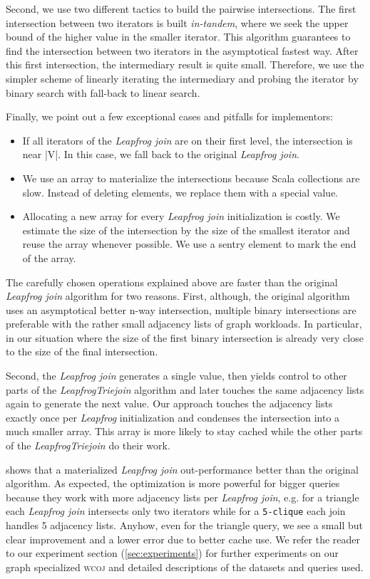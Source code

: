 Second, we use two different tactics to build the pairwise intersections.
The first intersection between two iterators is built \textit{in-tandem},  where we seek
the upper bound of the higher value in the smaller iterator.
This algorithm guarantees to find the intersection between two iterators in the asymptotical fastest
way.
After this first intersection, the intermediary result is quite small.
Therefore, we use the simpler scheme of linearly iterating the intermediary and probing
the iterator by binary search with fall-back to linear search.

Finally, we point out a few exceptional cases and pitfalls for implementors:
\begin{itemize}
\item If all iterators of the \textit{Leapfrog join} are on their first level, the intersection is near |V|. In this case, we fall back
to the original
\textit{Leapfrog join}.
\item We use an array to materialize the intersections because Scala collections are slow.
Instead of deleting elements, we replace them with a special value.
\item Allocating a new array for every \textit{Leapfrog join} initialization is costly.
We estimate the size of the intersection by the size of the smallest iterator and reuse the array whenever possible. We use a sentry element to mark the end of the array.
\end{itemize}

The carefully chosen operations explained above are faster than the original \textit{Leapfrog join}
algorithm for two reasons.
First, although, the original algorithm uses an asymptotical better n-way intersection, multiple
binary intersections are preferable with the rather small adjacency lists of graph workloads.
In particular, in our situation where the size of the first binary intersection is already
very close to the size of the final intersection.

Second, the \textit{Leapfrog join} generates a single value, then yields control to other parts
of the \textit{LeapfrogTriejoin} algorithm and later touches the same adjacency lists again to generate the next value.
Our approach touches the adjacency lists exactly once per \textit{Leapfrog} initialization and
condenses the intersection into a much smaller array.
This array is more likely to stay cached while the other parts of the \textit{LeapfrogTriejoin} do their work.

 shows that a materialized \textit{Leapfrog join} out-performance better than
the original algorithm.
As expected, the optimization is more powerful for bigger queries because they work with more
adjacency lists per \textit{Leapfrog join}, e.g. for a triangle each \textit{Leapfrog join} intersects
only two iterators while for a \texttt{5-clique} each join handles 5 adjacency lists.
Anyhow, even for the triangle query, we see a small but clear improvement and a lower error due to
better cache use.
We refer the reader to our experiment section (\ref{sec:experiments}) for further experiments on
our graph specialized \textsc{wcoj} and detailed descriptions of the datasets and queries used.

